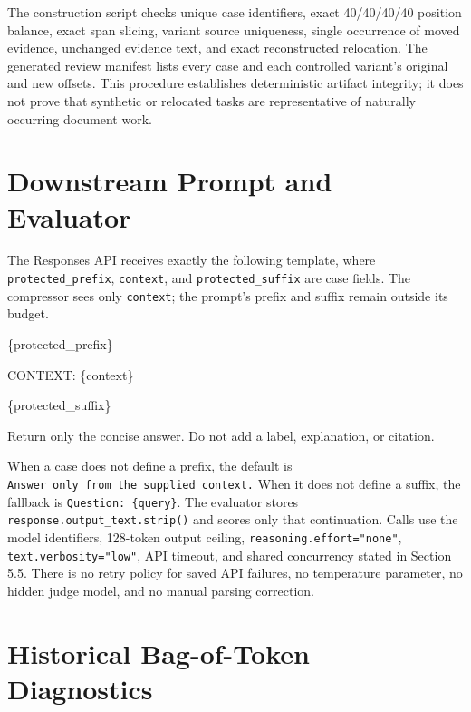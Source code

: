 \documentclass[
]{article}
\newenvironment{Shaded}{}{}
\newcommand{\NormalTok}[1]{#1}
\newcounter{none} %
\begin{document}
The construction script checks unique case identifiers, exact
40/40/40/40 position balance, exact span slicing, variant source
uniqueness, single occurrence of moved evidence, unchanged evidence
text, and exact reconstructed relocation. The generated review manifest
lists every case and each controlled variant's original and new offsets.
This procedure establishes deterministic artifact integrity; it does not
prove that synthetic or relocated tasks are representative of naturally
occurring document work.

\section{Downstream Prompt and
Evaluator}\label{downstream-prompt-and-evaluator}

The Responses API receives exactly the following template, where
\texttt{protected\_prefix}, \texttt{context}, and
\texttt{protected\_suffix} are case fields. The compressor sees only
\texttt{context}; the prompt's prefix and suffix remain outside its
budget.

\begin{Shaded}
\begin{Highlighting}[]
\NormalTok{\{protected\_prefix\}}

\NormalTok{CONTEXT:}
\NormalTok{\{context\}}

\NormalTok{\{protected\_suffix\}}

\NormalTok{Return only the concise answer. Do not add a label, explanation, or citation.}
\end{Highlighting}
\end{Shaded}

When a case does not define a prefix, the default is
\texttt{Answer\ only\ from\ the\ supplied\ context.} When it does not
define a suffix, the fallback is \texttt{Question:\ \{query\}}. The
evaluator stores \texttt{response.output\_text.strip()} and scores only
that continuation. Calls use the model identifiers, 128-token output
ceiling, \texttt{reasoning.effort="none"},
\texttt{text.verbosity="low"}, API timeout, and shared concurrency
stated in Section 5.5. There is no retry policy for saved API failures,
no temperature parameter, no hidden judge model, and no manual parsing
correction.

\section{Historical Bag-of-Token Diagnostics}\label{historical-v1-1-diagnostics}
\end{document}
